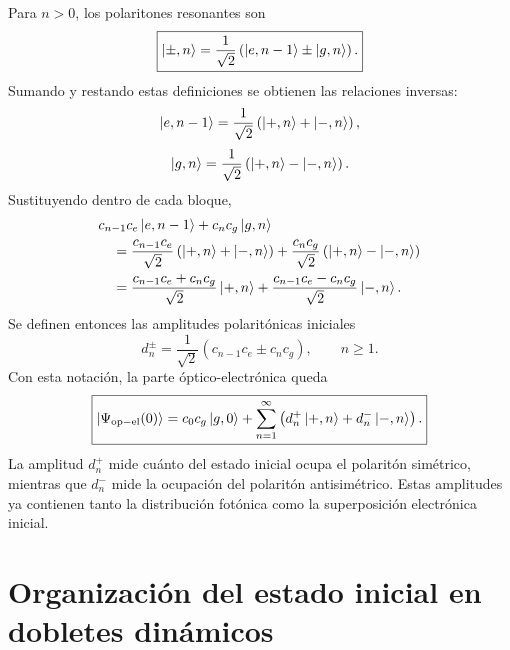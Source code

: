 \documentclass[11pt]{article}
\begin{document}
Para $n>0$, los polaritones resonantes son
\begin{equation}
  \boxed{
  \ket{\pm,n}
  =
  \frac{1}{\sqrt2}
  \left(
  \ket{e,n-1}\pm\ket{g,n}
  \right).
  }
\end{equation}
Sumando y restando estas definiciones se obtienen las relaciones inversas:
\begin{equation}
  \ket{e,n-1}
  =
  \frac{1}{\sqrt2}
  \left(
  \ket{+,n}+\ket{-,n}
  \right),
\end{equation}
\begin{equation}
  \ket{g,n}
  =
  \frac{1}{\sqrt2}
  \left(
  \ket{+,n}-\ket{-,n}
  \right).
\end{equation}
Sustituyendo dentro de cada bloque,
\begin{align}
  &c_{n-1}c_e\ket{e,n-1}
  +
  c_nc_g\ket{g,n}
  \notag\\
  &\quad=
  \frac{c_{n-1}c_e}{\sqrt2}
  \left(\ket{+,n}+\ket{-,n}\right)
  +
  \frac{c_nc_g}{\sqrt2}
  \left(\ket{+,n}-\ket{-,n}\right)
  \notag\\
  &\quad=
  \frac{c_{n-1}c_e+c_nc_g}{\sqrt2}\ket{+,n}
  +
  \frac{c_{n-1}c_e-c_nc_g}{\sqrt2}\ket{-,n}.
\end{align}
Se definen entonces las amplitudes polarit\'onicas iniciales
\begin{equation}
  \boxed{
  d_n^\pm
  =
  \frac{1}{\sqrt2}
  \left(
  c_{n-1}c_e\pm c_nc_g
  \right),
  \qquad n\geq1.
  }
\end{equation}
Con esta notaci\'on, la parte \'optico-electr\'onica queda
\begin{equation}
  \boxed{
  \ket{\Psi_{\mathrm{op-el}}(0)}
  =
  c_0c_g\ket{g,0}
  +
  \sum_{n=1}^{\infty}
  \left(
  d_n^+\ket{+,n}
  +
  d_n^-\ket{-,n}
  \right).
  }
\end{equation}
La amplitud $d_n^+$ mide cu\'anto del estado inicial ocupa el polarit\'on
sim\'etrico, mientras que $d_n^-$ mide la ocupaci\'on del polarit\'on
antisim\'etrico. Estas amplitudes ya contienen tanto la distribuci\'on
fot\'onica como la superposici\'on electr\'onica inicial.

\section{Organizaci\'on del estado inicial en dobletes din\'amicos}
\end{document}

